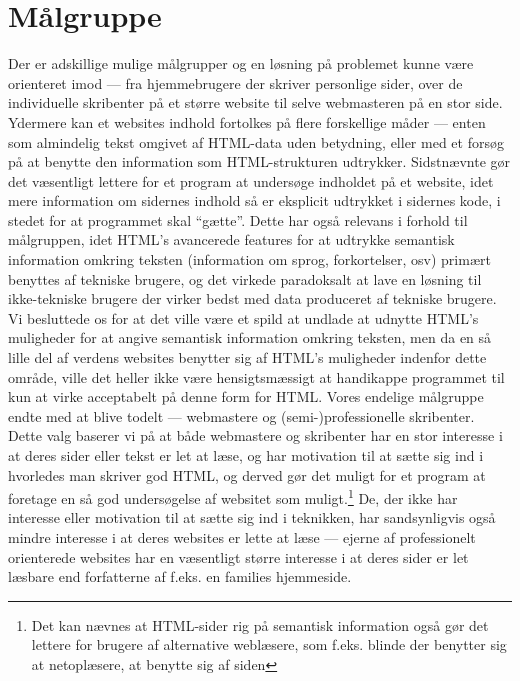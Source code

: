 \documentclass[a4paper,oneside,article]{memoir}
\begin{document}
\section{Målgruppe}
\label{målgruppe}
Der er adskillige mulige målgrupper og en løsning på problemet kunne være
orienteret imod --- fra hjemmebrugere der skriver personlige sider,
over de individuelle skribenter på et større website til selve
webmasteren på en stor side. Ydermere kan et websites indhold
fortolkes på flere forskellige måder --- enten som almindelig tekst
omgivet af HTML-data uden betydning, eller med et forsøg på at benytte
den information som HTML-strukturen udtrykker. Sidstnævnte gør det
væsentligt lettere for et program at undersøge indholdet på et
website, idet mere information om sidernes indhold så er eksplicit
udtrykket i sidernes kode, i stedet for at programmet skal
``gætte''. Dette har også relevans i forhold til målgruppen, idet
HTML's avancerede features for at udtrykke semantisk information
omkring teksten (information om sprog, forkortelser, osv) primært
benyttes af tekniske brugere, og det virkede paradoksalt at lave en
løsning til ikke-tekniske brugere der virker bedst med data produceret
af tekniske brugere. Vi besluttede os for at det ville være et spild
at undlade at udnytte HTML's muligheder for at angive semantisk
information omkring teksten, men da en så lille del af verdens
websites benytter sig af HTML's muligheder indenfor dette område,
ville det heller ikke være hensigtsmæssigt at handikappe programmet
til kun at virke acceptabelt på denne form for HTML. Vores endelige
målgruppe endte med at blive todelt --- webmastere og
(semi-)professionelle skribenter. Dette valg baserer vi på at både
webmastere og skribenter har en stor interesse i at deres sider eller
tekst er let at læse, og har motivation til at sætte sig ind i
hvorledes man skriver god HTML, og derved gør det muligt for et
program at foretage en så god undersøgelse af websitet som
muligt.\footnote{Det kan nævnes at HTML-sider rig på semantisk
  information også gør det lettere for brugere af alternative
  weblæsere, som f.eks. blinde der benytter sig at netoplæsere, at
  benytte sig af siden} De, der ikke har interesse eller motivation
til at sætte sig ind i teknikken, har sandsynligvis også mindre
interesse i at deres websites er lette at læse --- ejerne af
professionelt orienterede websites har en væsentligt større interesse
i at deres sider er let læsbare end forfatterne af f.eks. en families
hjemmeside.
\end{document}
